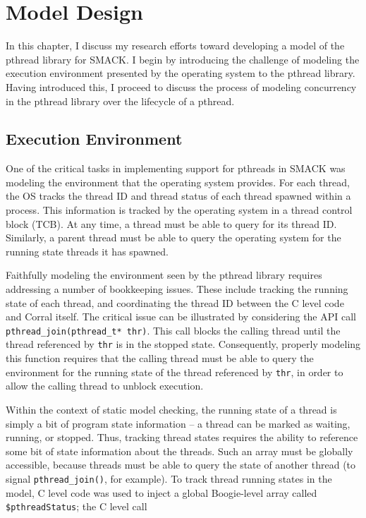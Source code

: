 \chapter{Model Design}\label{ch:modeldesign}
In this chapter, I discuss my research efforts toward developing a
model of the pthread library for SMACK.  I begin by introducing the
challenge of modeling the execution environment presented by the
operating system to the pthread library.  Having introduced this, I
proceed to discuss the process of modeling concurrency in the pthread
library over the lifecycle of a pthread.

\section{Execution Environment}
One of the critical tasks in implementing support for pthreads in
SMACK was modeling the environment that the operating system provides.
For each thread, the OS tracks the thread ID and thread status of
each thread spawned within a process.  This information is tracked by
the operating system in a thread control block (TCB).  At any time, a
thread must be able to query for its thread ID.  Similarly, a 
parent thread must be able to query the operating system for the
running state threads it has spawned.

Faithfully modeling the environment seen by the pthread library
requires addressing a number of bookkeeping issues.  These include
tracking the running state of each thread, and coordinating the thread
ID between the C level code and Corral itself.  The critical issue can
be illustrated by considering the API call
\lstinline|pthread_join(pthread_t* thr)|. This call blocks the calling
thread until the thread referenced by \lstinline|thr| is in the stopped
state.  Consequently, properly modeling this function requires that the
calling thread must be able to query the environment for the running
state of the thread referenced by \lstinline|thr|, in order to allow
the calling thread to unblock execution.

Within the context of static model checking, the running state of a
thread is simply a bit of program state information -- a thread can be
marked as waiting, running, or stopped. Thus, tracking thread states
requires the ability to reference some bit of state information about
the threads. Such an array must be globally accessible, because threads
must be able to query the state of another thread (to signal
\lstinline|pthread_join()|, for example).  To track thread running
states in the model, C level code was used to inject a global
Boogie-level array called \lstinline|$pthreadStatus|; the C level call   

